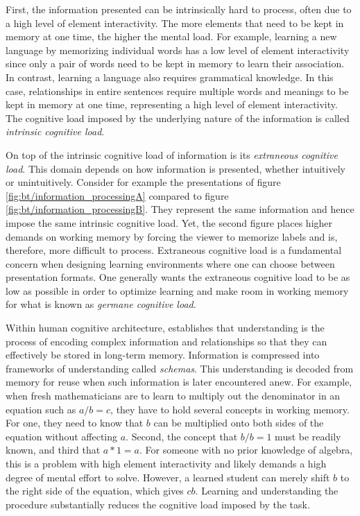 First, the information presented can be intrinsically hard to process, often due to a high level of element interactivity. The more elements that need to be kept in memory at one time, the higher the mental load. For example, learning a new language by memorizing individual words has a low level of element interactivity since only a pair of words need to be kept in memory to learn their association. In contrast, learning a language also requires grammatical knowledge. In this case, relationships in entire sentences require multiple words and meanings to be kept in memory at one time, representing a high level of element interactivity. The cognitive load imposed by the underlying nature of the information is called \textit{intrinsic cognitive load}.

On top of the intrinsic cognitive load of information is its \textit{extraneous cognitive load}. This domain depends on how information is presented, whether intuitively or unintuitively. Consider for example the presentations of figure \ref{fig:bt/information_processingA} compared to figure \ref{fig:bt/information_processingB}. They represent the same information and hence impose the same intrinsic cognitive load. Yet, the second figure places higher demands on working memory by forcing the viewer to memorize labels and is, therefore, more difficult to process. Extraneous cognitive load is a fundamental concern when designing learning environments where one can choose between presentation formats. One generally wants the extraneous cognitive load to be as low as possible in order to optimize learning and make room in working memory for what is known as \textit{germane cognitive load}.

Within human cognitive architecture, \textcite{sweller1988} establishes that understanding is the process of encoding complex information and relationships so that they can effectively be stored in long-term memory. Information is compressed into frameworks of understanding called \textit{schemas}. This understanding is decoded from memory for reuse when such information is later encountered anew. For example, when fresh mathematicians are to learn to multiply out the denominator in an equation such as $a/b=c$, they have to hold several concepts in working memory. For one, they need to know that $b$ can be multiplied onto both sides of the equation without affecting $a$. Second, the concept that $b/b=1$ must be readily known, and third that $a*1=a$. For someone with no prior knowledge of algebra, this is a problem with high element interactivity and likely demands a high degree of mental effort to solve. However, a learned student can merely shift $b$ to the right side of the equation, which gives $cb$. Learning and understanding the procedure substantially reduces the cognitive load imposed by the task. 

